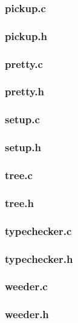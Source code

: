 \documentclass[a4paper,10pt,titlepage]{report}
\begin{document}
\subsubsection{pickup.c}


\subsubsection{pickup.h}


\subsubsection{pretty.c}


\subsubsection{pretty.h}


\subsubsection{setup.c}


\subsubsection{setup.h}


\subsubsection{tree.c}


\subsubsection{tree.h}


\subsubsection{typechecker.c}


\subsubsection{typechecker.h}


\subsubsection{weeder.c}


\subsubsection{weeder.h}

\end{document}
